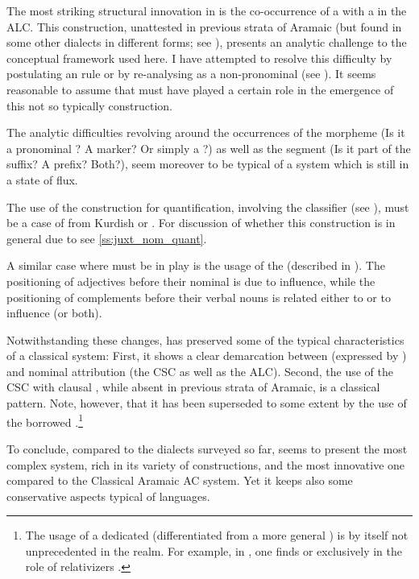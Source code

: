 The most striking structural innovation in \JUrm is the co-occurrence of a \cst* \prim with a \lnk* in the ALC. This construction, unattested in previous strata of Aramaic (but found in  some other  dialects in different forms; see ), presents an analytic challenge to the conceptual framework used here. I have attempted to resolve this difficulty  by postulating an  rule or by re-analysing   as a non-pronominal \lnk* (see ). It seems reasonable to assume that   must have played a certain role in the emergence of this not so typically  construction. 

The analytic difficulties revolving around the occurrences of the morpheme  (Is it a pronominal \lnk*? A \secn marker? Or simply a \dem*?) as well as the  segment (Is it part of the \cst* suffix? A \gen* prefix? Both?), seem moreover to be typical of a system which is still in a state of flux. 

The use of the  construction for quantification,   involving the  classifier  (see ), must be a case of  from Kurdish or . For discussion of whether this construction is in general due to  see \ref{ss:juxt_nom_quant}. 

A similar case where  must be in play is the usage of the  (described in ).  The positioning of adjectives before their nominal \prims is due to  influence, while the positioning of complements before their verbal nouns is related either to \Kur or to \Azr influence (or both).


Notwithstanding these changes, \JUrm has preserved some of the typical characteristics of a classical  system: First, it shows a clear demarcation between  (expressed by ) and nominal attribution (the CSC as well as the ALC). Second, the use of the CSC with clausal \secns, while absent in previous strata of Aramaic, is a  classical  pattern. Note, however, that it has been superseded to some extent by the use of the borrowed  .\footnote{The usage of a dedicated  (differentiated from a more general \lnk*) is by itself not unprecedented in the  realm. For example, in \BHeb, one finds  or   exclusively in the role of relativizers  \citep[331, \S 19.2]{WaltkeOconnor}.}

\largerpage
To conclude, compared to the dialects surveyed so far, \JUrm seems to present the most complex  system, rich in its variety of constructions, and the most innovative one compared to the Classical Aramaic AC system. Yet it keeps also some conservative aspects typical of  languages. 







